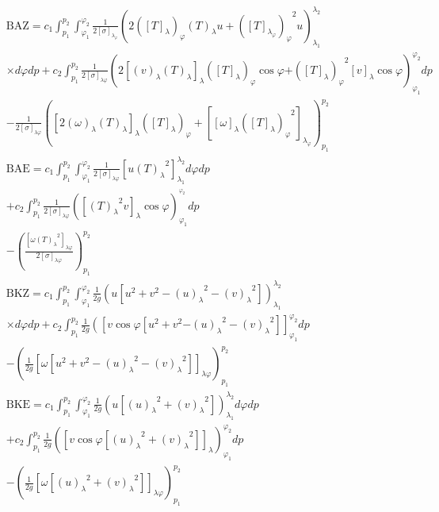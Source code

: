 \documentclass[pdflatex,sn-chicago]{sn-jnl}%
\theoremstyle{plain}
\theoremstyle{definition}
\theoremstyle{remark}
\theoremstyle{definition}
\begin{document}
\begin{align}
& \mathrm{BAZ}=c_1 \int_{p_1}^{p_2} \int_{\varphi_1}^{\varphi_2} \frac{1}{2[\sigma]_{\lambda_{\varphi}}}\left(2\left([T]_\lambda\right)_{\varphi}(T)_\lambda u+{\left([T]_{\lambda_{\varphi}}\right)_{\varphi}}^2 u\right)_{\lambda_1}^{\lambda_2} \nonumber \\
& \times d \varphi d p+c_2 \int_{p_1}^{p_2} \frac{1}{2[\sigma]_{\lambda \varphi}}\left(2\left[(v)_\lambda(T)_\lambda\right]_\lambda\left([T]_\lambda\right)_{\varphi} \cos \varphi \right. \left.+{\left([T]_\lambda\right)_{\varphi}}^2[v]_\lambda \cos \varphi\right)_{\varphi_1}^{\varphi_2} d p \nonumber \\
& -\frac{1}{2[\sigma]_{\lambda \varphi}}\left(\left[2(\omega)_\lambda(T)_\lambda\right]_\lambda\left([T]_\lambda\right)_{\varphi}+\left[[\omega]_\lambda{\left([T]_\lambda\right)_{\varphi}}^2\right]_{\lambda_{\varphi}}\right)_{p_1}^{p_2} \\
& \mathrm{BAE}=c_1 \int_{p_1}^{p_2} \int_{\varphi_1}^{\varphi_2} \frac{1}{2[\sigma]_{\lambda \varphi}}\left[u{(T)_\lambda}^2\right]_{\lambda_1}^{\lambda_2} d \varphi d p \nonumber \\
& +c_2 \int_{p_1}^{p_2} \frac{1}{2[\sigma]_{\lambda \varphi}}\left(\left[{(T)_\lambda}^2 v\right]_\lambda \cos \varphi\right)_{\varphi_1}^{^{\varphi_2}} d p \\
& -\left(\frac{\left[\omega{(T)_\lambda}^2\right]_{\lambda \varphi}}{2[\sigma]_{\lambda \varphi}}\right)_{p_1}^{p_2} \nonumber \\
& \mathrm{BKZ}=c_1 \int_{p_1}^{p_2} \int_{\varphi_1}^{\varphi_2} \frac{1}{2 g}\left(u\left[u^2+v^2-{(u)_\lambda}^2-{(v)_\lambda}^2\right]\right)_{\lambda_1}^{\lambda_2} \nonumber \\
& \times d \varphi d p+c_2 \int_{p_1}^{p_2} \frac{1}{2 g}\left(\left[v \cos \varphi \left[u^2+v^2\right.\right.\right. \left.\left.-{(u)_\lambda}^2-{(v)_\lambda}^2\right]\right]_{\varphi_1}^{\varphi_2} d p  \\
& -\left(\frac{1}{2 g}\left[\omega\left[u^2+v^2-{(u)_\lambda}^2-{(v)_\lambda}^2\right]\right]_{\lambda \varphi}\right)_{p_1}^{p_2} \nonumber \\
& \mathrm{BKE}=c_1 \int_{p_1}^{p_2} \int_{\varphi_1}^{\varphi_2} \frac{1}{2 g}\left(u\left[{(u)_\lambda}^2+{(v)_\lambda}^2\right]\right)_{\lambda_1}^{\lambda_2} d \varphi d p \nonumber \\
& +c_2 \int_{p_1}^{p_2} \frac{1}{2 g}\left(\left[v \cos \varphi\left[{(u)_\lambda}^2+{(v)_\lambda}^2\right]\right]_\lambda\right)_{\varphi_1}^{\varphi_2} d p \\
& -\left(\frac{1}{2 g}\left[\omega\left[{(u)_\lambda}^2+{(v)_\lambda}^2\right]\right]_{\lambda \varphi}\right)_{p_1}^{p_2} \nonumber
\end{align}
\end{document}
